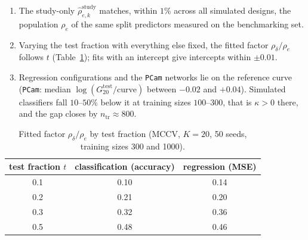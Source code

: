 \documentclass[11pt]{article}
\begin{document}
\begin{enumerate}
  \item The study-only $\widehat\rho^{\mathrm{study}}_{e,k}$ matches, within $1\%$ across all
        simulated designs, the population $\rho_e$ of the same split predictors measured on
        the benchmarking set.
  \item Varying the test fraction with everything else fixed, the fitted factor
        $\rho_\delta/\rho_e$ follows $t$ (Table~\ref{tab:factor}); fits with an intercept give
        intercepts within $\pm 0.01$.
  \item Regression configurations and the \texttt{PCam} networks lie on the reference curve
        (\texttt{PCam}: median $\log(G^{\text{test}}_{20}/\text{curve})$ between $-0.02$ and
        $+0.04$). Simulated classifiers fall $10$--$50\%$ below it at training sizes
        $100$--$300$, that is $\kappa > 0$ there, and the gap closes by
        $n_{\text{tr}} \approx 800$.
\end{enumerate}

\begin{table}[ht]
  \centering
  \caption{Fitted factor $\rho_\delta/\rho_e$ by test fraction (MCCV, $K=20$, 50 seeds,
           training sizes 300 and 1000).}
  \label{tab:factor}
  \begin{tabular}{@{}ccc@{}}
    \toprule
    test fraction $t$ & classification (accuracy) & regression (MSE) \\
    \midrule
    0.1 & 0.10 & 0.14 \\
    0.2 & 0.21 & 0.20 \\
    0.3 & 0.32 & 0.36 \\
    0.5 & 0.48 & 0.46 \\
    \bottomrule
  \end{tabular}
\end{table}

\end{document}

